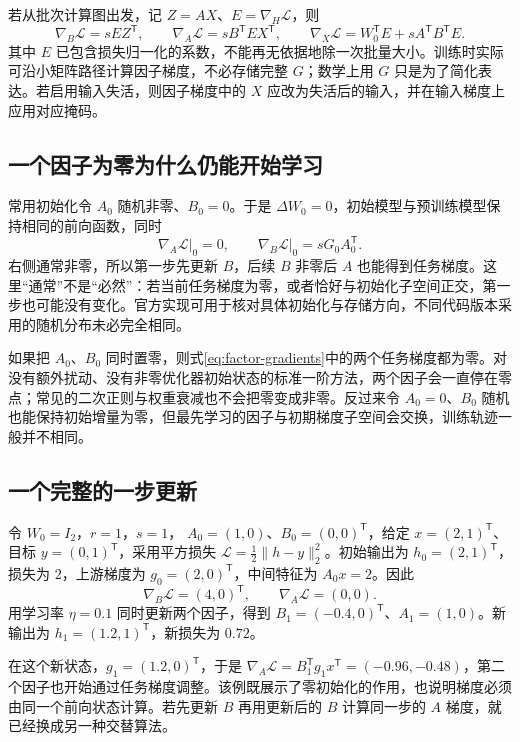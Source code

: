 \documentclass[UTF8,12pt,a4paper,fontset=fandol]{ctexart}
\begin{document}
若从批次计算图出发，记 $Z=AX$、$E=\nabla_H\mathcal L$，则
\[
\nabla_B\mathcal L=sEZ^{\mathsf T},\qquad
\nabla_A\mathcal L=sB^{\mathsf T}EX^{\mathsf T},\qquad
\nabla_X\mathcal L=W_0^{\mathsf T}E+sA^{\mathsf T}B^{\mathsf T}E.
\]
其中 $E$ 已包含损失归一化的系数，不能再无依据地除一次批量大小。训练时实际可沿小矩阵路径计算因子梯度，不必存储完整 $G$；数学上用 $G$ 只是为了简化表达。若启用输入失活，则因子梯度中的 $X$ 应改为失活后的输入，并在输入梯度上应用对应掩码。

\subsection{一个因子为零为什么仍能开始学习}

常用初始化令 $A_0$ 随机非零、$B_0=0$。于是 $\Delta W_0=0$，初始模型与预训练模型保持相同的前向函数，同时
\[
\left.\nabla_A\mathcal L\right|_0=0,\qquad
\left.\nabla_B\mathcal L\right|_0=sG_0A_0^{\mathsf T}.
\]
右侧通常非零，所以第一步先更新 $B$，后续 $B$ 非零后 $A$ 也能得到任务梯度。这里“通常”不是“必然”：若当前任务梯度为零，或者恰好与初始化子空间正交，第一步也可能没有变化。官方实现可用于核对具体初始化与存储方向\cite{lora-code}，不同代码版本采用的随机分布未必完全相同。

如果把 $A_0$、$B_0$ 同时置零，则式\eqref{eq:factor-gradients}中的两个任务梯度都为零。对没有额外扰动、没有非零优化器初始状态的标准一阶方法，两个因子会一直停在零点；常见的二次正则与权重衰减也不会把零变成非零。反过来令 $A_0=0$、$B_0$ 随机也能保持初始增量为零，但最先学习的因子与初期梯度子空间会交换，训练轨迹一般并不相同。

\subsection{一个完整的一步更新}

令 $W_0=I_2$，$r=1$，$s=1$，
$A_0=(1,0)$、$B_0=(0,0)^{\mathsf T}$，给定
$x=(2,1)^{\mathsf T}$、目标 $y=(0,1)^{\mathsf T}$，采用平方损失
$\mathcal L=\frac12\|h-y\|_2^2$。初始输出为 $h_0=(2,1)^{\mathsf T}$，损失为 $2$，上游梯度为 $g_0=(2,0)^{\mathsf T}$，中间特征为 $A_0x=2$。因此
\[
\nabla_B\mathcal L=(4,0)^{\mathsf T},\qquad
\nabla_A\mathcal L=(0,0).
\]
用学习率 $\eta=0.1$ 同时更新两个因子，得到
$B_1=(-0.4,0)^{\mathsf T}$、$A_1=(1,0)$。新输出为
$h_1=(1.2,1)^{\mathsf T}$，新损失为 $0.72$。

在这个新状态，$g_1=(1.2,0)^{\mathsf T}$，于是
$\nabla_A\mathcal L=B_1^{\mathsf T}g_1x^{\mathsf T}
=(-0.96,-0.48)$，第二个因子也开始通过任务梯度调整。该例既展示了零初始化的作用，也说明梯度必须由同一个前向状态计算。若先更新 $B$ 再用更新后的 $B$ 计算同一步的 $A$ 梯度，就已经换成另一种交替算法。
\end{document}
